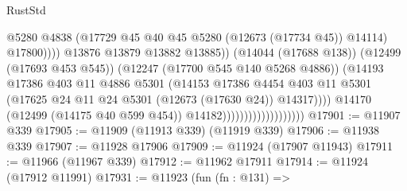 \begin{lexlean}{RustStd}
\begin{coremodule}
{\begin{coremodule}
{{{{{{{{{{{{{{{{{{{{{{{{{{{{{{{{{{{{{{{{{{{{{{{{{{{{{{{{{{{{{{{{{{{{{{{{{{{{{{{{                                                        @5280
                                                        @4838
                                                        (@17729
                                                          @45
                                                          @40
                                                          @45
                                                          @5280
                                                          (@12673 (@17734 @45))
                                                          @14114)
                                                        @17800))))
                                                @13876
                                                @13879
                                                @13882
                                                @13885))
                                            (@14044 (@17688 @138))
                                            (@12499 (@17693 @453 @545))
                                            (@12247 (@17700 @545 @140 @5268 @4886))
                                            (@14193
                                              @17386
                                              @403
                                              @11
                                              @4886
                                              @5301
                                              (@14153
                                                @17386
                                                @4454
                                                @403
                                                @11
                                                @5301
                                                (@17625
                                                  @24
                                                  @11
                                                  @24
                                                  @5301
                                                  (@12673 (@17630 @24))
                                                  @14317))))
                                          @14170
                                          (@12499 (@14175 @40 @599 @454))
                                          @14182)))))))))))))))))))
@17901 := @11907 @339
@17905 := @11909 (@11913 @339) (@11919 @339)
@17906 := @11938 @339
@17907 := @11928 @17906
@17909 := @11924 (@17907 @11943)
@17911 := @11966 (@11967 @339)
@17912 := @11962 @17911
@17914 := @11924 (@17912 @11991)
@17931 := @11923
    (fun (fn : @131) =>
}}}}}}}}}}}}}}}}}}}}}}}}}}}}}}}}}}}}}}}}}}}}}}}}}}}}}}}}}}}}}}}}}}}}}}}}}}}}}}}}
\end{coremodule}}
\end{coremodule}
\end{lexlean}
